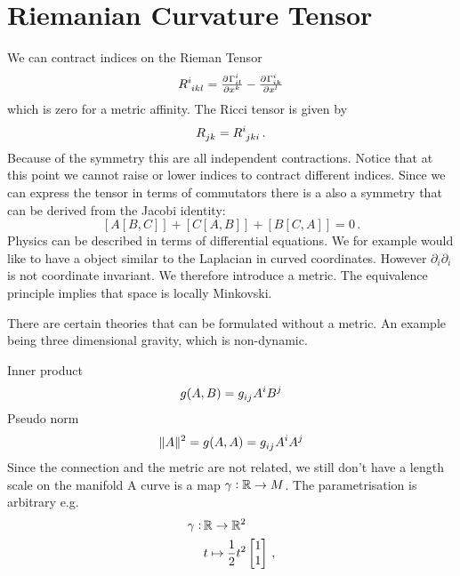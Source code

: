 \section{Riemanian Curvature Tensor}
We can contract indices on the Rieman Tensor
\begin{equation}
\tensor{R}{^i_i_k_l}=\pd{{\Gamma^i_{il}}}{{x^k}}-\pd{{\Gamma^i_{ik}}}{{x^l}}
\end{equation}
which is zero for a metric affinity. The Ricci tensor is given by
\begin{equation}
\tensor{R}{_j_k}=\tensor{R}{^i_j_k_i}\, .
\end{equation}
Because of the symmetry this are all independent contractions. Notice that at
this point we cannot raise or lower indices to contract different indices.
Since we can express the  tensor in terms of commutators there is
a also a symmetry that can be derived from the Jacobi identity:
\begin{equation}
\left[A\left[B,C\right]\right]
+\left[C\left[A,B\right]\right]
+\left[B\left[C,A\right]\right]=0\,.
\end{equation}
Physics can be described in terms of differential equations. We for example
would like to have a object similar to the Laplacian in curved coordinates.
However $\partial_i\partial_i$ is not coordinate invariant. We therefore
introduce a metric. The equivalence principle implies that space is locally
Minkovski.
\begin{sidenote}
There are certain theories that can be formulated without a metric. An example
being three dimensional gravity, which is non-dynamic. 
\end{sidenote}
Inner product 
\begin{equation}
g(A,B)=\tensor{g}{_i_j}\tensor{A}{^i}\tensor{B}{^j}
\end{equation}
Pseudo norm
\begin{equation}
\|A\|^2=g(A,A)=\tensor{g}{_i_j}\tensor{A}{^i}\tensor{A}{^j}
\end{equation}
Since the connection and the metric are not related, we still don't have a length
scale on the manifold
A curve is a map $\gamma:\mathbb{R}\to M$. The parametrisation is arbitrary e.g.
\begin{equation}
\begin{split}
\gamma:\, &\mathbb{R}\to \mathbb{R}^2\\
& t\mapsto
\frac{1}{2} t^2
\begin{bmatrix}
1 \\
1
\end{bmatrix}\, ,
\end{split}
\end{equation}
